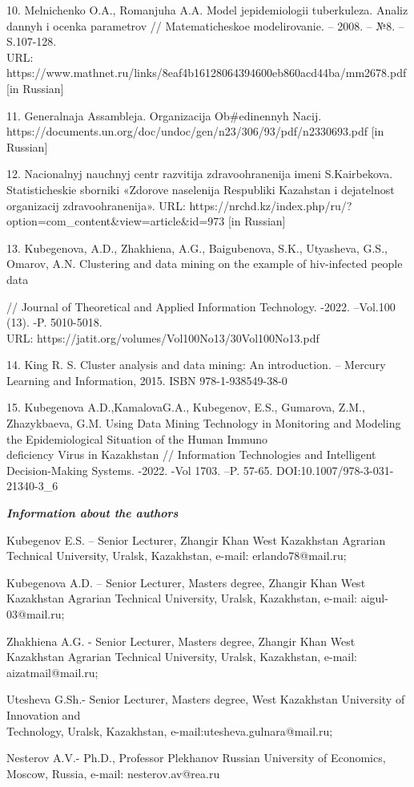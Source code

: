 \begin{noparindent}
10. Mel\textquotesingle nichenko O.A., Romanjuha A.A.
Model\textquotesingle{} jepidemiologii tuberkuleza. Analiz dannyh i
ocenka parametrov // Matematicheskoe modelirovanie. -- 2008. -- №8. --
S.107-128. \\URL:
https://www.mathnet.ru/links/8eaf4b16128064394600eb860acd44ba/mm2678.pdf
{[}in Russian{]}

11. General\textquotesingle naja Assambleja. Organizacija Ob\#edinennyh
Nacij.
\\https://documents.un.org/doc/undoc/gen/n23/306/93/pdf/n2330693.pdf {[}in
Russian{]}

12. Nacional\textquotesingle nyj nauchnyj centr razvitija
zdravoohranenija imeni S.Kairbekova. Statisticheskie sborniki
«Zdorov\textquotesingle e naselenija Respubliki Kazahstan i
dejatel\textquotesingle nost\textquotesingle{} organizacij
zdravoohranenija».
URL:
https://nrchd.kz/index.php/ru/?option=com\_content\&view=article\&id=973
{[}in Russian{]}

13. Kubegenova, A.D., Zhakhiena, A.G., Baigubenova, S.K., Utyasheva,
G.S., Omarov, A.N. Clustering and data mining on the example of
hiv-infected people data

// Journal of Theoretical and Applied Information Technology. -2022.
--Vol.100 (13). -P. 5010-5018.\\ URL:
https://jatit.org/volumes/Vol100No13/30Vol100No13.pdf

14. King R. S. Cluster analysis and data mining: An introduction. --
Mercury Learning and Information, 2015. ISBN 978-1-938549-38-0

15. Kubegenova A.D.,KamalovaG.A., Kubegenov, E.S., Gumarova, Z.M.,
Zhazykbaeva, G.M. Using Data Mining Technology in Monitoring and
Modeling the Epidemiological Situation of the Human Immuno\\deficiency
Virus in Kazakhstan // Information Technologies and Intelligent
Decision-Making Systems. -2022. -Vol 1703. --P. 57-65.
DOI:10.1007/978-3-031-21340-3\_6
\end{noparindent}


\emph{{\bfseries Information about the authors}}
\begin{noparindent}

Kubegenov E.S. -- Senior Lecturer, Zhangir Khan West Kazakhstan Agrarian
Technical University, Uralsk, Kazakhstan, e-mail: erlando78@mail.ru;

Kubegenova A.D. -- Senior Lecturer, Master\textquotesingle s degree,
Zhangir Khan West Kazakhstan Agrarian Technical University, Uralsk,
Kazakhstan, e-mail: aigul-03@mail.ru;

Zhakhiena A.G. - Senior Lecturer, Master\textquotesingle s degree,
Zhangir Khan West Kazakhstan Agrarian Technical University, Uralsk,
Kazakhstan, e-mail: aizatmail@mail.ru;

Utesheva G.Sh.- Senior Lecturer, Master\textquotesingle s degree, West
Kazakhstan University of Innovation and \\Technology, Uralsk, Kazakhstan,
e-mail:utesheva.gulnara@mail.ru;

Nesterov A.V.- Ph.D., Professor Plekhanov Russian University of
Economics, Moscow, Russia, e-mail: nesterov.av@rea.ru
\end{noparindent}

